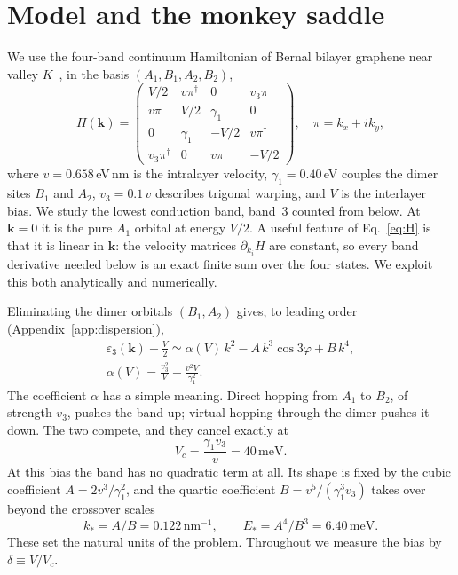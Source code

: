 \documentclass[aps,prb,twocolumn,superscriptaddress,floatfix,nofootinbib]{revtex4-2}
\newcommand{\bk}{\mathbf{k}}
\newcommand{\meV}{\,\mathrm{meV}}
\newcommand{\nm}{\,\mathrm{nm}}
\begin{document}
\section{Model and the monkey saddle}\label{sec:model}

We use the four-band continuum Hamiltonian of Bernal bilayer graphene near valley $K$~\cite{McCann2006,McCann2013}, in the basis $(A_1,B_1,A_2,B_2)$,
\begin{equation}
H(\bk)=\begin{pmatrix}
V/2 & v\pi^\dagger & 0 & v_3\pi\\
v\pi & V/2 & \gamma_1 & 0\\
0 & \gamma_1 & -V/2 & v\pi^\dagger\\
v_3\pi^\dagger & 0 & v\pi & -V/2
\end{pmatrix},\quad \pi=k_x+ik_y,
\label{eq:H}
\end{equation}
where $v=0.658\,$eV\,nm is the intralayer velocity, $\gamma_1=0.40\,$eV couples the dimer sites $B_1$ and $A_2$, $v_3=0.1\,v$ describes trigonal warping, and $V$ is the interlayer bias. We study the lowest conduction band, band~3 counted from below. At $\bk=0$ it is the pure $A_1$ orbital at energy $V/2$. A useful feature of Eq.~\eqref{eq:H} is that it is linear in $\bk$: the velocity matrices $\partial_{k_i}H$ are constant, so every band derivative needed below is an exact finite sum over the four states. We exploit this both analytically and numerically.

Eliminating the dimer orbitals $(B_1,A_2)$ gives, to leading order (Appendix~\ref{app:dispersion}),
\begin{gather}
\varepsilon_3(\bk)-\frac V2\simeq \alpha(V)\,k^2-A\,k^3\cos3\varphi+B\,k^4,\nonumber\\
\alpha(V)=\frac{v_3^2}{V}-\frac{v^2V}{\gamma_1^2}.
\label{eq:disp}
\end{gather}
The coefficient $\alpha$ has a simple meaning. Direct hopping from $A_1$ to $B_2$, of strength $v_3$, pushes the band up; virtual hopping through the dimer pushes it down. The two compete, and they cancel exactly at
\begin{equation}
V_c=\frac{\gamma_1v_3}{v}=40\meV .
\end{equation}
At this bias the band has no quadratic term at all. Its shape is fixed by the cubic coefficient $A=2v^3/\gamma_1^2$, and the quartic coefficient $B=v^5/(\gamma_1^3v_3)$ takes over beyond the crossover scales
\begin{equation}
k_*=A/B=0.122\nm^{-1},\qquad E_*=A^4/B^3=6.40\meV .
\end{equation}
These set the natural units of the problem. Throughout we measure the bias by $\delta\equiv V/V_c$.
\end{document}
